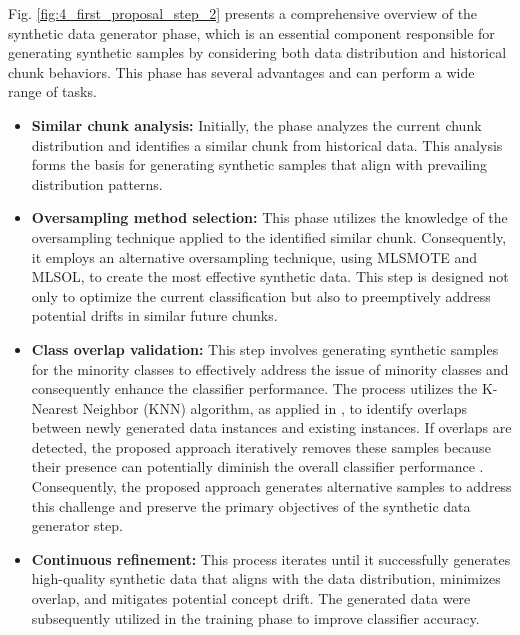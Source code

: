 Fig. \ref{fig:4_first_proposal_step_2} presents a comprehensive overview of the synthetic data generator phase, which is an essential component responsible for generating synthetic samples by considering both data distribution and historical chunk behaviors. This phase has several advantages and can perform a wide range of tasks.
\begin{itemize}
	\item \textbf{Similar chunk analysis:} Initially, the phase analyzes the current chunk distribution and identifies a similar chunk from historical data. This analysis forms the basis for generating synthetic samples that align with prevailing distribution patterns.
	\item \textbf{Oversampling method selection:} This phase utilizes the knowledge of the oversampling technique applied to the identified similar chunk. Consequently, it employs an alternative oversampling technique, using MLSMOTE and MLSOL, to create the most effective synthetic data. This step is designed not only to optimize the current classification but also to preemptively address potential drifts in similar future chunks.
	\item \textbf{Class overlap validation:} This step involves generating synthetic samples for the minority classes to effectively address the issue of minority classes and consequently enhance the classifier performance. The process utilizes the K-Nearest Neighbor (KNN) algorithm, as applied in \cite{lu2016concept}, to identify overlaps between newly generated data instances and existing instances. If overlaps are detected, the proposed approach iteratively removes these samples because their presence can potentially diminish the overall classifier performance \cite{cruz2017meta, widmer1996learning}. Consequently, the proposed approach generates alternative samples to address this challenge and preserve the primary objectives of the synthetic data generator step.
	\item \textbf{Continuous refinement:} This process iterates until it successfully generates high-quality synthetic data that aligns with the data distribution, minimizes overlap, and mitigates potential concept drift. The generated data were subsequently utilized in the training phase to improve classifier accuracy.
\end{itemize}

